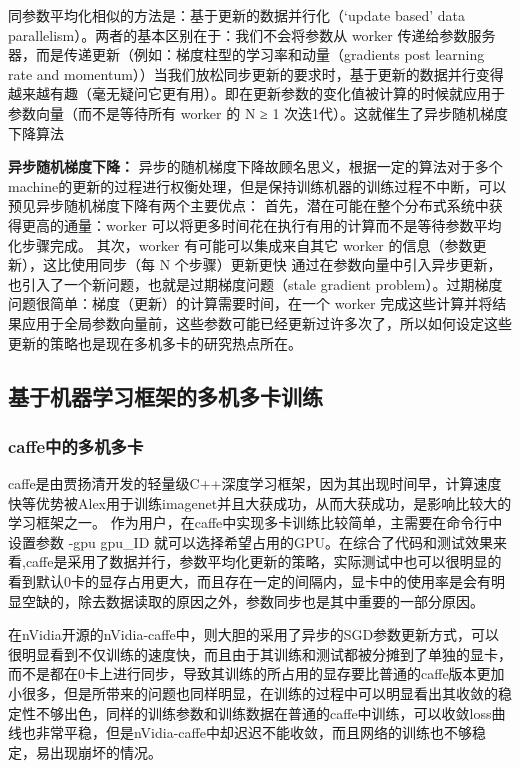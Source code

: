 同参数平均化相似的方法是：基于更新的数据并行化（‘update based’ data parallelism）。两者的基本区别在于：我们不会将参数从 worker 传递给参数服务器，而是传递更新（例如：梯度柱型的学习率和动量（gradients post learning rate and momentum））当我们放松同步更新的要求时，基于更新的数据并行变得越来越有趣（毫无疑问它更有用）。即在更新参数的变化值被计算的时候就应用于参数向量（而不是等待所有 worker 的 N ≥ 1 次迭1代）。这就催生了异步随机梯度下降算法

\textbf{异步随机梯度下降：}
异步的随机梯度下降故顾名思义，根据一定的算法对于多个machine的更新的过程进行权衡处理，但是保持训练机器的训练过程不中断，可以预见异步随机梯度下降有两个主要优点：
首先，潜在可能在整个分布式系统中获得更高的通量：worker 可以将更多时间花在执行有用的计算而不是等待参数平均化步骤完成。
其次，worker 有可能可以集成来自其它 worker 的信息（参数更新），这比使用同步（每 N 个步骤）更新更快
通过在参数向量中引入异步更新，也引入了一个新问题，也就是过期梯度问题（stale gradient problem）。过期梯度问题很简单：梯度（更新）的计算需要时间，在一个 worker 完成这些计算并将结果应用于全局参数向量前，这些参数可能已经更新过许多次了，所以如何设定这些更新的策略也是现在多机多卡的研究热点所在。

\subsection{基于机器学习框架的多机多卡训练}
\subsubsection{caffe中的多机多卡}
caffe是由贾扬清开发的轻量级C++深度学习框架，因为其出现时间早，计算速度快等优势被Alex用于训练imagenet并且大获成功，从而大获成功，是影响比较大的学习框架之一。
作为用户，在caffe中实现多卡训练比较简单，主需要在命令行中设置参数 -gpu  gpu\_ID 就可以选择希望占用的GPU。在综合了代码和测试效果来看,caffe是采用了数据并行，参数平均化更新的策略，实际测试中也可以很明显的看到默认0卡的显存占用更大，而且存在一定的间隔内，显卡中的使用率是会有明显空缺的，除去数据读取的原因之外，参数同步也是其中重要的一部分原因。

在nVidia开源的nVidia-caffe中，则大胆的采用了异步的SGD参数更新方式，可以很明显看到不仅训练的速度快，而且由于其训练和测试都被分摊到了单独的显卡，而不是都在0卡上进行同步，导致其训练的所占用的显存要比普通的caffe版本更加小很多，但是所带来的问题也同样明显，在训练的过程中可以明显看出其收敛的稳定性不够出色，同样的训练参数和训练数据在普通的caffe中训练，可以收敛loss曲线也非常平稳，但是nVidia-caffe中却迟迟不能收敛，而且网络的训练也不够稳定，易出现崩坏的情况。


